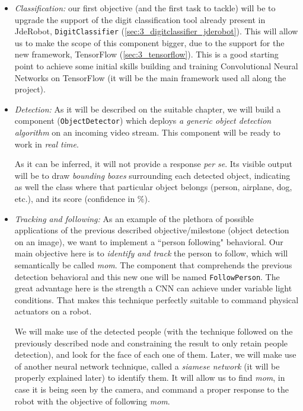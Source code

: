 	\begin{itemize}
		\item \textit{Classification:} our first objective (and the first task to tackle) will be to upgrade the support of the digit classification tool already present in JdeRobot, \texttt{DigitClassifier} (\autoref{sec:3_digitclassifier_jderobot}). This will allow us to make the scope of this component bigger, due to the support for the new framework, TensorFlow (\autoref{sec:3_tensorflow}). This is a good starting point to achieve some initial skills building and training Convolutional Neural Networks on TensorFlow (it will be the main framework used all along the project).
		
		
		\item \textit{Detection:} As it will be described on the suitable chapter, we will build a component (\texttt{ObjectDetector}) which deploys \textit{a generic object detection algorithm} on an incoming video stream. This component will be ready to work in \emph{real time}.
		
		As it can be inferred, it will not provide a response \textit{per se}. Its visible output will be to draw \emph{bounding boxes} surrounding each detected object, indicating as well the class where that particular object belongs (person, airplane, dog, etc.), and its score (confidence in \%).
		
		\item \textit{Tracking and following:} As an example of the plethora of possible applications of the previous described objective/milestone (object detection on an image), we want to implement a ``person following" behavioral. Our main objective here is to \textit{identify and track} the person to follow, which will semantically be called \emph{mom}. The component that comprehends the previous detection behavioral and this new one will be named \texttt{FollowPerson}. The great advantage here is the strength a CNN can achieve under variable light conditions. That makes this technique perfectly suitable to command physical actuators on a robot.
		
		We will make use of the detected people (with the technique followed on the previously described node and constraining the result to only retain people detection), and look for the face of each one of them. Later, we will make use of another neural network technique, called a \emph{siamese network} (it will be properly explained later) to identify them. It will allow us to find \emph{mom}, in case it is being seen by the camera, and command a proper response to the robot with the objective of following \emph{mom}.
	\end{itemize}

